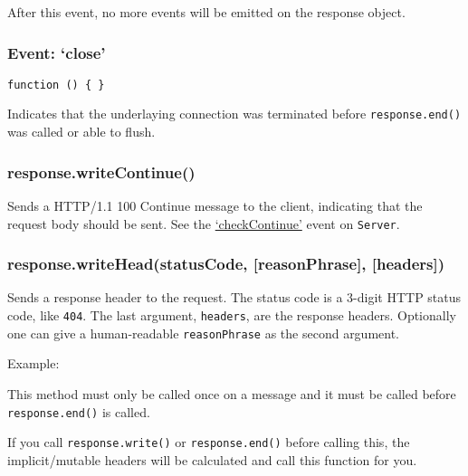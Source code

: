 After this event, no more events will be emitted on the response object.

\subsubsection{Event: `close'}

\texttt{function () \{ \}}

Indicates that the underlaying connection was terminated before
\texttt{response.end()} was called or able to flush.

\subsubsection{response.writeContinue()}

Sends a HTTP/1.1 100 Continue message to the client, indicating that the
request body should be sent. See the
\hyperref[http\_event\_checkcontinue]{`checkContinue'} event on
\texttt{Server}.

\subsubsection{response.writeHead(statusCode, {[}reasonPhrase{]},
{[}headers{]})}

Sends a response header to the request. The status code is a 3-digit
HTTP status code, like \texttt{404}. The last argument,
\texttt{headers}, are the response headers. Optionally one can give a
human-readable \texttt{reasonPhrase} as the second argument.

Example:

\begin{Shaded}
\begin{Highlighting}[]
 \NormalTok{;}
\NormalTok{(}\NormalTok{, \{}
  \NormalTok{: }\NormalTok{,}
  \NormalTok{: } \NormalTok{\});}
\end{Highlighting}
\end{Shaded}

This method must only be called once on a message and it must be called
before \texttt{response.end()} is called.

If you call \texttt{response.write()} or \texttt{response.end()} before
calling this, the implicit/mutable headers will be calculated and call
this function for you.

